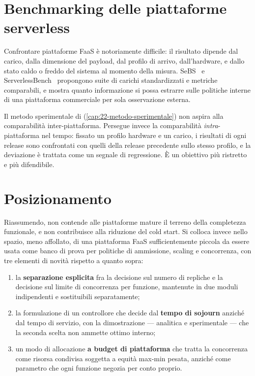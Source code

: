 \section{Benchmarking delle piattaforme serverless}

Confrontare piattaforme FaaS \`e notoriamente difficile: il risultato dipende dal
carico, dalla dimensione del payload, dal profilo di arrivo, dall'hardware, e
dallo stato caldo o freddo del sistema al momento della misura.
SeBS~\cite{copik2021sebs} e ServerlessBench~\cite{yu2020serverlessbench}
propongono suite di carichi standardizzati e metriche comparabili, e
\cite{wang2018peeking} mostra quanto informazione si possa estrarre sulle
politiche interne di una piattaforma commerciale per sola osservazione esterna.

Il metodo sperimentale di \nf{} (\cref{cap:22-metodo-sperimentale}) non aspira
alla comparabilit\`a inter-piattaforma. Persegue invece la comparabilit\`a
\emph{intra}-piattaforma nel tempo: fissato un profilo hardware e un carico, i
risultati di ogni release sono confrontati con quelli della release precedente
sullo stesso profilo, e la deviazione \`e trattata come un segnale di
regressione. \`E un obiettivo pi\`u ristretto e pi\`u difendibile.

\section{Posizionamento}

Riassumendo, \nf{} non contende alle piattaforme mature il terreno della
completezza funzionale, e non contribuisce alla riduzione del cold start. Si
colloca invece nello spazio, meno affollato, di una piattaforma FaaS
sufficientemente piccola da essere usata come banco di prova per politiche di
ammissione, scaling e concorrenza, con tre elementi di novit\`a rispetto a
quanto sopra:

\begin{enumerate}[leftmargin=*]
  \item la \textbf{separazione esplicita} fra la decisione sul numero di repliche
  e la decisione sul limite di concorrenza per funzione, mantenute in due moduli
  indipendenti e sostituibili separatamente;
  \item la formulazione di un controllore che decide dal \textbf{tempo di
  sojourn} anzich\'e dal tempo di servizio, con la dimostrazione --- analitica e
  sperimentale --- che la seconda scelta non ammette ottimo interno;
  \item un modo di allocazione \textbf{a budget di piattaforma} che tratta la
  concorrenza come risorsa condivisa soggetta a equit\`a max-min pesata, anzich\'e
  come parametro che ogni funzione negozia per conto proprio.
\end{enumerate}
